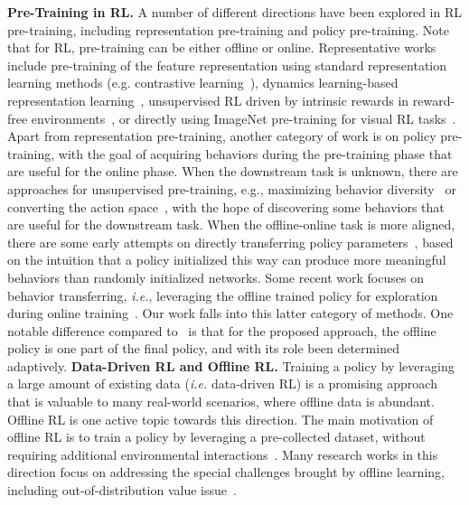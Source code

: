 \documentclass{article}
\begin{document}
\vspace{-0.1in}
{\flushleft\textbf{Pre-Training in RL.}}
A number of different directions have been explored in RL pre-training, including representation pre-training and policy pre-training.
Note that for RL, pre-training can be either offline or online.
Representative works include pre-training of the feature representation using standard representation learning methods ({e.g.} contrastive learning~\citep{offlne_rl_pretrain}),  dynamics learning-based representation learning~\citep[{e.g.}][]{repr_pre_training, APV}, unsupervised RL driven by intrinsic rewards in reward-free environments~\citep[{e.g.}][]{behavior_from_void}, or directly using ImageNet pre-training for visual RL tasks~\citep[{e.g.}][]{resnet_pretrain, imagenet_pretrain}.
Apart from representation pre-training,
another category of work is on policy pre-training, with the goal of acquiring behaviors
during the pre-training phase that are useful for the online phase.
When the downstream task is unknown, there are approaches for unsupervised pre-training, {e.g.},
maximizing behavior diversity~\citep{DIAYN} or converting the action space~\cite{parrot}, with the hope of discovering some behaviors that are useful for the downstream task.
When the offline-online task is more aligned, there are some early attempts on directly transferring policy parameters~\citep{DAPG}, based on the intuition that a policy initialized this way can produce more meaningful behaviors than randomly initialized networks.
Some recent work focuses on behavior transferring, \emph{i.e.}, leveraging the offline trained policy for exploration during online training~\citep{behavior_transfer,jump_start_RL}. Our work falls into this latter category of methods. One notable difference compared to~\cite{behavior_transfer,jump_start_RL} is that for the proposed approach, the offline policy is one part of the final policy,
and with its role been determined adaptively.
\vspace{-0.15in}
{\flushleft\textbf{Data-Driven RL and Offline RL.}}
Training a policy by leveraging a large amount of existing data (\emph{i.e.} data-driven RL) is a promising
approach that is valuable to many real-world scenarios, where offline data is abundant.
Offline RL is one active topic towards this direction. The main motivation of
offline RL is to train a policy by leveraging a pre-collected dataset, without requiring additional environmental interactions~\citep{offline_rl}.
Many research works in this direction focus on addressing the special challenges brought by offline learning, including out-of-distribution value issue~\citep{cql}.
\end{document}
